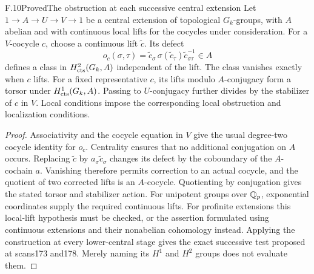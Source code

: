 \begin{statement}{F.10}{Proved}{The obstruction at each successive central extension}
Let $1\to A\to U\to V\to1$ be a central extension of
topological $G_k$-groups, with $A$ abelian and with
continuous local lifts for the cocycles under consideration.
For a $V$-cocycle $c$, choose a continuous lift $\widetilde c$.
Its defect
\[
 o_c(\sigma,\tau)=
 \widetilde c_\sigma\,\sigma(\widetilde c_\tau)
                    \widetilde c_{\sigma\tau}^{-1}\in A
\]
defines a class in $H^2_{\rm cts}(G_k,A)$ independent
of the lift. The class vanishes exactly when $c$ lifts.
For a fixed representative $c$, its lifts modulo
$A$-conjugacy form a torsor under $H^1_{\rm cts}(G_k,A)$.
Passing to $U$-conjugacy further divides by the stabilizer
of $c$ in $V$. Local conditions impose the corresponding
local obstruction and localization conditions.
\end{statement}
\begin{proof}
Associativity and the cocycle equation in $V$ give the
usual degree-two cocycle identity for $o_c$. Centrality
ensures that no additional conjugation on $A$ occurs.
Replacing $\widetilde c$ by $a_\sigma\widetilde c_\sigma$
changes its defect by the coboundary of the $A$-cochain
$a$. Vanishing therefore permits correction to an
actual cocycle, and the quotient of two corrected
lifts is an $A$-cocycle. Quotienting by conjugation gives
the stated torsor and stabilizer action.
For unipotent groups over $\mathbb Q_p$, exponential coordinates
supply the required continuous lifts. For profinite
extensions this local-lift hypothesis must be checked,
or the assertion formulated using continuous extensions
and their nonabelian cohomology instead.
Applying the construction at every lower-central stage
gives the exact successive test proposed at scans173
and178. Merely naming its $H^1$ and $H^2$ groups does
not evaluate them.
\end{proof}

